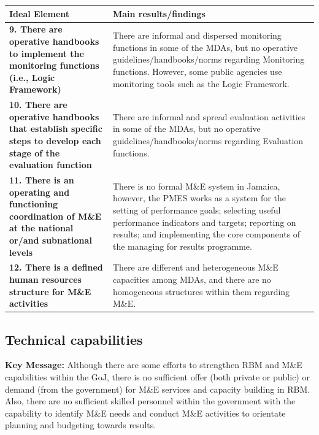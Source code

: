 \documentclass[
  10pt,
]{book}
\begin{document}
\begin{tabu} to 
\hline
Ideal Element & Main results/findings\\
\hline
\textbf{9. There are operative handbooks to implement the monitoring functions (i.e., Logic Framework)} & There are informal and dispersed monitoring functions in some of the MDAs, but no operative guidelines/handbooks/norms regarding Monitoring functions. However, some public agencies use monitoring tools such as the Logic Framework.\\
\hline
\textbf{10. There are operative handbooks that establish specific steps to develop each stage of the evaluation function} & There are informal and spread evaluation activities in some of the MDAs, but no operative guidelines/handbooks/norms regarding Evaluation functions.\\
\hline
\textbf{11. There is an operating and functioning coordination of M\&E at the national or/and subnational levels} & There is no formal M\&E system in Jamaica, however, the PMES works as a system for the setting of performance goals; selecting useful performance indicators and targets; reporting on results; and implementing the core components of the managing for results programme.\\
\hline
\textbf{12. There is a defined human resources structure for M\&E activities} & There are different and heterogeneous M\&E capacities among MDAs, and there are no homogeneous structures within them regarding M\&E.\\
\hline
\end{tabu}
\endgroup{}

\hypertarget{technical-capabilities}{%
\subsection{Technical capabilities}\label{technical-capabilities}}

\textbf{Key Message:}
Although there are some efforts to strengthen RBM and M\&E capabilities within the GoJ, there is no sufficient offer (both private or public) or demand (from the government) for M\&E services and capacity building in RBM. Also, there are no sufficient skilled personnel within the government with the capability to identify M\&E needs and conduct M\&E activities to orientate planning and budgeting towards results.

\begingroup\fontsize{12}{14}\selectfont
\end{document}
